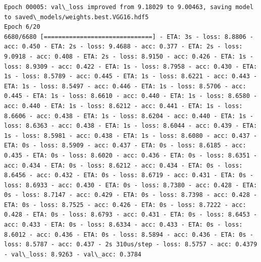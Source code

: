 \documentclass[11pt]{article}
\begin{document}
\begin{Verbatim}[commandchars=\\\{\}]
Epoch 00005: val\_loss improved from 9.18029 to 9.00463, saving model to saved\_models/weights.best.VGG16.hdf5
Epoch 6/20
6680/6680 [==============================] - ETA: 3s - loss: 8.8806 - acc: 0.450 - ETA: 2s - loss: 9.4688 - acc: 0.377 - ETA: 2s - loss: 9.0918 - acc: 0.408 - ETA: 2s - loss: 8.9150 - acc: 0.426 - ETA: 1s - loss: 8.9309 - acc: 0.422 - ETA: 1s - loss: 8.7958 - acc: 0.430 - ETA: 1s - loss: 8.5789 - acc: 0.445 - ETA: 1s - loss: 8.6221 - acc: 0.443 - ETA: 1s - loss: 8.5497 - acc: 0.446 - ETA: 1s - loss: 8.5706 - acc: 0.445 - ETA: 1s - loss: 8.6610 - acc: 0.440 - ETA: 1s - loss: 8.6580 - acc: 0.440 - ETA: 1s - loss: 8.6212 - acc: 0.441 - ETA: 1s - loss: 8.6606 - acc: 0.438 - ETA: 1s - loss: 8.6204 - acc: 0.440 - ETA: 1s - loss: 8.6363 - acc: 0.438 - ETA: 1s - loss: 8.6044 - acc: 0.439 - ETA: 1s - loss: 8.5981 - acc: 0.438 - ETA: 1s - loss: 8.6080 - acc: 0.437 - ETA: 0s - loss: 8.5909 - acc: 0.437 - ETA: 0s - loss: 8.6185 - acc: 0.435 - ETA: 0s - loss: 8.6020 - acc: 0.436 - ETA: 0s - loss: 8.6351 - acc: 0.434 - ETA: 0s - loss: 8.6212 - acc: 0.434 - ETA: 0s - loss: 8.6456 - acc: 0.432 - ETA: 0s - loss: 8.6719 - acc: 0.431 - ETA: 0s - loss: 8.6933 - acc: 0.430 - ETA: 0s - loss: 8.7380 - acc: 0.428 - ETA: 0s - loss: 8.7147 - acc: 0.429 - ETA: 0s - loss: 8.7398 - acc: 0.428 - ETA: 0s - loss: 8.7525 - acc: 0.426 - ETA: 0s - loss: 8.7222 - acc: 0.428 - ETA: 0s - loss: 8.6793 - acc: 0.431 - ETA: 0s - loss: 8.6453 - acc: 0.433 - ETA: 0s - loss: 8.6334 - acc: 0.433 - ETA: 0s - loss: 8.6012 - acc: 0.436 - ETA: 0s - loss: 8.5894 - acc: 0.436 - ETA: 0s - loss: 8.5787 - acc: 0.437 - 2s 310us/step - loss: 8.5757 - acc: 0.4379 - val\_loss: 8.9263 - val\_acc: 0.3784


\end{Verbatim}
\end{document}
